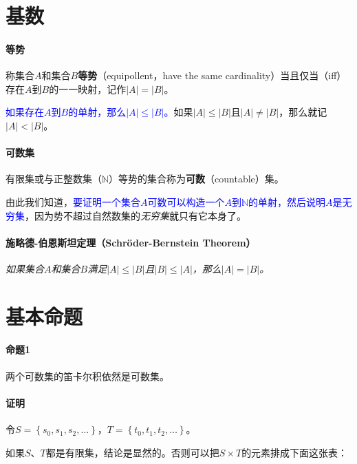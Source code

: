 \documentclass[b5paper,oneside]{ctexbook}
\newcommand{\Blue}[1]{\textcolor[named]{blue}{#1}}
\begin{document}
\section{基数}
\paragraph{等势}称集合$A$和集合$B$\textbf{等势}（equipollent，have the same cardinality）当且仅当（iff）存在$A$到$B$的一一映射，记作$|A|=|B|$。

\Blue{如果存在$A$到$B$的单射，那么$|A|\leq |B|$。}如果$|A|\leq |B|$且$|A|\neq |B|$，那么就记$|A|<|B|$。

\paragraph{可数集}有限集或与正整数集（$\mathbb{N}$）等势的集合称为\textbf{可数}（countable）集。

由此我们知道，\Blue{要证明一个集合$A$可数可以构造一个$A$到$\mathbb{N}$的单射，然后说明$A$是无穷集}，因为势不超过自然数集的\textit{无穷集}就只有它本身了。

\paragraph{施略德-伯恩斯坦定理（Schr\"oder-Bernstein Theorem）}\textit{如果集合$A$和集合$B$满足$|A|\leq |B|$且$|B|\leq |A|$，那么$|A|=|B|$。}
\section{基本命题}
\paragraph{命题1}两个可数集的笛卡尔积依然是可数集。\label{basicprop1}
\paragraph{证明}令$S = \left\{{s_0, s_1, s_2, \ldots}\right\}$，$T = \left\{{t_0, t_1, t_2, \ldots}\right\}$。

如果$S$、$T$都是有限集，结论是显然的。否则可以把$S \times T$的元素排成下面这张表：

\begin{center}
\end{center}
\end{document}
